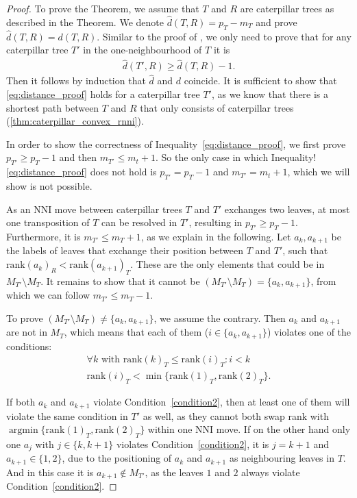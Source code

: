 \documentclass[11pt]{amsart}
\newcommand{\rank}{\mathrm{rank}}
\newcommand{\nni}{\mathrm{NNI}}
\DeclareMathOperator*{\argmin}{argmin}
\begin{document}
\begin{proof}
	To prove the Theorem, we assume that $T$ and $R$ are caterpillar trees as described in the Theorem.
	We denote $\hat d(T,R) = p_T - m_T$ and prove $\hat d(T,R) = d(T,R)$.
	Similar to the proof of \autocite[Theorem 1]{Collienne2020-iu}, we only need to prove that for any caterpillar tree $T'$ in the one-neighbourhood of $T$ it is
	\begin{align}
		\hat d(T',R) \geq \hat d(T,R) - 1.
		\label{eq:distance_proof}
	\end{align}
	Then it follows by induction that $\hat d$ and $d$ coincide.
	It is sufficient to show that \autoref{eq:distance_proof} holds for a caterpillar tree $T'$, as we know that there is a shortest path between $T$ and $R$ that only consists of caterpillar trees (\autoref{thm:caterpillar_convex_rnni}).

	In order to show the correctness of Inequality~\ref{eq:distance_proof}, we first prove $p_{T'} \geq p_T - 1$ and then $m_{T'} \leq m_t + 1$.
	So the only case in which Inequality!\ref{eq:distance_proof} does not hold is $p_{T'} = p_T - 1$ and $m_{T'} = m_t + 1$, which we will show is not possible.

	As an $\nni$ move between caterpillar trees $T$ and $T'$ exchanges two leaves, at most one transposition of $T$ can be resolved in $T'$, resulting in $p_{T'} \geq p_T - 1$.
	Furthermore, it is $m_{T'} \leq m_T + 1$, as we explain in the following.
	Let $a_k, a_{k+1}$ be the labels of leaves that exchange their position between $T$ and $T'$, such that $\rank(a_k)_R < \rank(a_{k+1})_T$.
	These are the only elements that could be in $M_{T'} \setminus M_T$.
	It remains to show that it cannot be $(M_{T'} \setminus M_T) = \{a_k, a_{k+1}\}$, from which we can follow $m_{T'} \leq m_T - 1$.

	To prove $(M_{T'} \setminus M_T) \neq \{a_k, a_{k+1}\}$, we assume the contrary.
	Then $a_k$ and $a_{k+1}$ are not in $M_T$, which means that each of them ($i \in \{a_k,a_{k+1}\}$) violates one of the conditions:
	\begin{align}
		\forall k \text{ with } \rank(k)_T \leq \rank(i)_T: i < k \label{condition1}\\
		\rank(i)_T < \min\{\rank(1)_T, \rank(2)_T\}.
		\label{condition2}
	\end{align}

	If both $a_k$ and $a_{k+1}$ violate Condition~\ref{condition2}, then at least one of them will violate the same condition in $T'$ as well, as they cannot both swap rank with $\argmin\{\rank(1)_T, \rank(2)_T\}$ within one $\nni$ move.
	If on the other hand only one $a_j$ with $j \in \{k, k+1\}$ violates Condition~\ref{condition2}, it is $j = k+1$ and $a_{k+1} \in \{1,2\}$, due to the positioning of $a_k$ and $a_{k+1}$ as neighbouring leaves in $T$.
	And in this case it is $a_{k+1} \notin M_{T'}$, as the leaves $1$ and $2$ always violate Condition~\ref{condition2}.


\end{proof}
\end{document}

